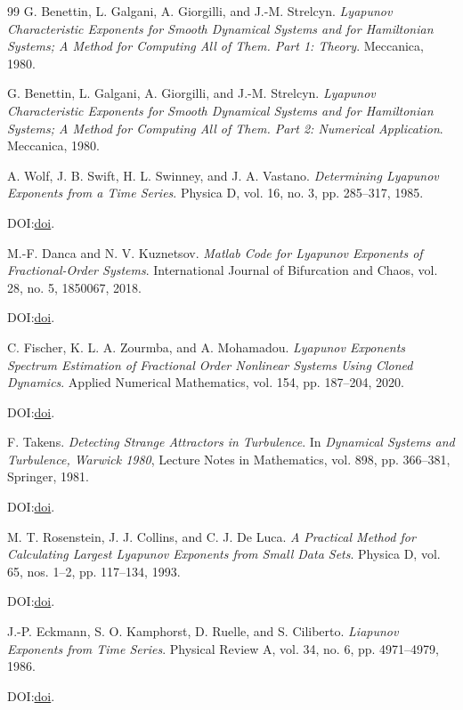 \documentclass[11pt]{article}
\begin{document}
\begin{thebibliography}{99}
G. Benettin, L. Galgani, A. Giorgilli, and J.-M. Strelcyn.
\emph{Lyapunov Characteristic Exponents for Smooth Dynamical Systems and for Hamiltonian Systems; A Method for Computing All of Them. Part 1: Theory}.
Meccanica, 1980.

G. Benettin, L. Galgani, A. Giorgilli, and J.-M. Strelcyn.
\emph{Lyapunov Characteristic Exponents for Smooth Dynamical Systems and for Hamiltonian Systems; A Method for Computing All of Them. Part 2: Numerical Application}.
Meccanica, 1980.

A. Wolf, J. B. Swift, H. L. Swinney, and J. A. Vastano.
\emph{Determining Lyapunov Exponents from a Time Series}.
Physica D, vol. 16, no. 3, pp. 285--317, 1985.
\par\noindent DOI:\@ \href{https://doi.org/10.1016/0167-2789(85)90011-9}{doi}.

M.-F. Danca and N. V. Kuznetsov.
\emph{Matlab Code for Lyapunov Exponents of Fractional-Order Systems}.
International Journal of Bifurcation and Chaos, vol. 28, no. 5,
1850067, 2018.
\par\noindent DOI:\@ \href{https://doi.org/10.1142/S0218127418500670}{doi}.

C. Fischer, K. L. A. Zourmba, and A. Mohamadou.
\emph{Lyapunov Exponents Spectrum Estimation of Fractional Order Nonlinear
Systems Using Cloned Dynamics}.
Applied Numerical Mathematics, vol. 154, pp. 187--204, 2020.
\par\noindent DOI:\@ \href{https://doi.org/10.1016/j.apnum.2020.03.027}{doi}.

F. Takens.
\emph{Detecting Strange Attractors in Turbulence}.
In \emph{Dynamical Systems and Turbulence, Warwick 1980},
Lecture Notes in Mathematics, vol. 898, pp. 366--381, Springer, 1981.
\par\noindent DOI:\@ \href{https://doi.org/10.1007/BFb0091924}{doi}.

M. T. Rosenstein, J. J. Collins, and C. J. De Luca.
\emph{A Practical Method for Calculating Largest Lyapunov Exponents from
Small Data Sets}.
Physica D, vol. 65, nos. 1--2, pp. 117--134, 1993.
\par\noindent DOI:\@ \href{https://doi.org/10.1016/0167-2789(93)90009-P}{doi}.

J.-P. Eckmann, S. O. Kamphorst, D. Ruelle, and S. Ciliberto.
\emph{Liapunov Exponents from Time Series}.
Physical Review A, vol. 34, no. 6, pp. 4971--4979, 1986.
\par\noindent DOI:\@ \href{https://doi.org/10.1103/PhysRevA.34.4971}{doi}.


\end{thebibliography}
\end{document}
